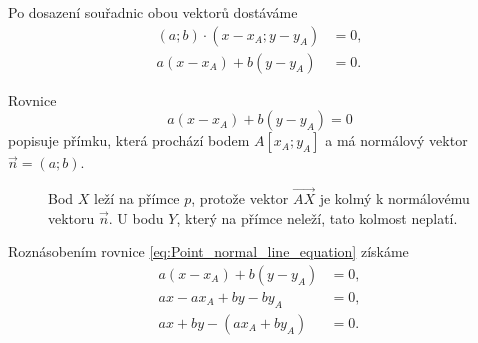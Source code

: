 Po dosazení souřadnic obou vektorů dostáváme
\begin{align*}
    (a;b)\cdot(x-x_A;y-y_A)&=0,\\
    a(x-x_A)+b(y-y_A)&=0.
\end{align*}

Rovnice
\begin{equation}\label{eq:Point_normal_line_equation}
    a(x-x_A)+b(y-y_A)=0
\end{equation}
popisuje přímku, která prochází bodem $A[x_A;y_A]$ a má normálový
vektor $\vec{n}=(a;b)$.

\begin{figure}[H]
    \centering
    \caption{Bod $X$ leží na přímce $p$, protože vektor
    $\overrightarrow{AX}$ je kolmý k normálovému vektoru $\vec{n}$.
    U bodu $Y$, který na přímce neleží, tato kolmost neplatí.}
    \label{fig:General_line_derivation}
\end{figure}

Roznásobením rovnice \eqref{eq:Point_normal_line_equation} získáme
\begin{align*}
    a(x-x_A)+b(y-y_A)&=0,\\
    ax-ax_A+by-by_A&=0,\\
    ax+by-(ax_A+by_A)&=0.
\end{align*}

